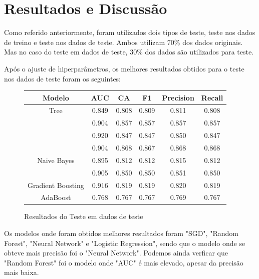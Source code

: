 \newpage
\section*{Resultados e Discussão}

Como referido anteriormente, foram utilizados dois tipos de teste, teste nos dados de treino e teste nos dados de teste. Ambos utilizam 70\% dos dados originais. Mas no caso do teste em dados de teste, 30\% dos dados são utilizados para teste.

Após o ajuste de hiperparâmetros, os melhores resultados obtidos para o teste nos dados de teste foram os seguintes:

\begin{figure}[H]
    \begin{center}
    \setlength{\arrayrulewidth}{0.5mm}
    \renewcommand{\arraystretch}{1.5}
    \begin{tabular}{|c|c|c|c|c|c|}
        \hline
        \textbf{Modelo} & \textbf{AUC} & \textbf{CA} & \textbf{F1} & \textbf{Precision} & \textbf{Recall} \\
        \hline
         Tree  &  0.849 & 0.808 & 0.809 & 0.811 & 0.808 \\
         \hline
         \color{red}{SGD} & 0.904 & 0.857 & 0.857 & 0.857 & 0.857 \\
         \hline
         \color{red}{Random Forest} & 0.920 & 0.847 & 0.847 & 0.850 & 0.847 \\ 
         \hline
         \color{red}{Neural Network} & 0.904 & 0.868 & 0.867 & 0.868 & 0.868 \\
         \hline
         Naive Bayes & 0.895 & 0.812 & 0.812 & 0.815 & 0.812 \\ 
         \hline
         \color{red}{Logistic Regression} & 0.905 & 0.850 & 0.850 & 0.851 & 0.850 \\ 
         \hline
         Gradient Boosting & 0.916 & 0.819 & 0.819 & 0.820 & 0.819 \\ 
         \hline
         AdaBoost & 0.768 & 0.767 & 0.767 & 0.769 & 0.767  \\
         \hline
    \end{tabular}
\end{center}
 \caption{Resultados do Teste em dados de teste}
\end{figure}

Os modelos onde foram obtidos melhores resultados foram "SGD", "Random Forest", "Neural Network" e "Logistic Regression", sendo que o modelo onde se obteve mais precisão foi o "Neural Network". Podemos ainda verficar que "Random Forest" foi o modelo onde "AUC" é mais elevado, apesar da precisão mais baixa.
\newpage

